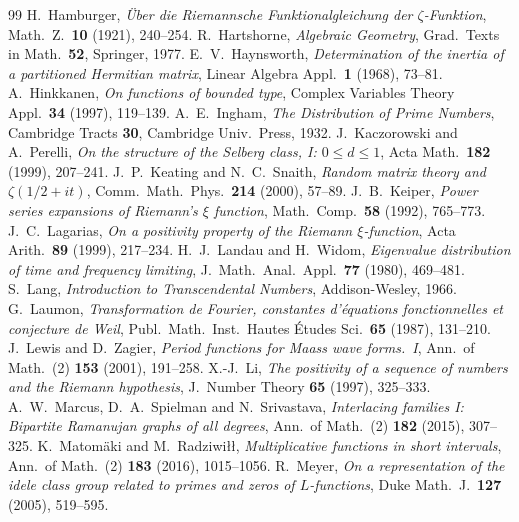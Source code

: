 \documentclass[11pt]{amsart}
\theoremstyle{definition}
\theoremstyle{remark}
\numberwithin{equation}{section}
\begin{document}
\begin{thebibliography}{99}
 H.~Hamburger, \emph{\"Uber die Riemannsche Funktionalgleichung der $\zeta$-Funktion}, Math.\ Z.\ \textbf{10} (1921), 240--254.
 R.~Hartshorne, \emph{Algebraic Geometry}, Grad.\ Texts in Math.\ \textbf{52}, Springer, 1977.
 E.~V.~Haynsworth, \emph{Determination of the inertia of a partitioned Hermitian matrix}, Linear Algebra Appl.\ \textbf{1} (1968), 73--81.
 A.~Hinkkanen, \emph{On functions of bounded type}, Complex Variables Theory Appl.\ \textbf{34} (1997), 119--139.
 A.~E.~Ingham, \emph{The Distribution of Prime Numbers}, Cambridge Tracts \textbf{30}, Cambridge Univ.\ Press, 1932.
 J.~Kaczorowski and A.~Perelli, \emph{On the structure of the Selberg class, I: $0\le d\le1$}, Acta Math.\ \textbf{182} (1999), 207--241.
 J.~P.~Keating and N.~C.~Snaith, \emph{Random matrix theory and $\zeta(1/2+it)$}, Comm.\ Math.\ Phys.\ \textbf{214} (2000), 57--89.
 J.~B.~Keiper, \emph{Power series expansions of Riemann's $\xi$ function}, Math.\ Comp.\ \textbf{58} (1992), 765--773.
 J.~C.~Lagarias, \emph{On a positivity property of the Riemann $\xi$-function}, Acta Arith.\ \textbf{89} (1999), 217--234.
 H.~J.~Landau and H.~Widom, \emph{Eigenvalue distribution of time and frequency limiting}, J.\ Math.\ Anal.\ Appl.\ \textbf{77} (1980), 469--481.
 S.~Lang, \emph{Introduction to Transcendental Numbers}, Addison-Wesley, 1966.
 G.~Laumon, \emph{Transformation de Fourier, constantes d'\'equations fonctionnelles et conjecture de Weil}, Publ.\ Math.\ Inst.\ Hautes \'Etudes Sci.\ \textbf{65} (1987), 131--210.
 J.~Lewis and D.~Zagier, \emph{Period functions for Maass wave forms.\ I}, Ann.\ of Math.\ (2) \textbf{153} (2001), 191--258.
 X.-J.~Li, \emph{The positivity of a sequence of numbers and the Riemann hypothesis}, J.\ Number Theory \textbf{65} (1997), 325--333.
 A.~W.~Marcus, D.~A.~Spielman and N.~Srivastava, \emph{Interlacing families I: Bipartite Ramanujan graphs of all degrees}, Ann.\ of Math.\ (2) \textbf{182} (2015), 307--325.
 K.~Matom\"aki and M.~Radziwi\l\l, \emph{Multiplicative functions in short intervals}, Ann.\ of Math.\ (2) \textbf{183} (2016), 1015--1056.
 R.~Meyer, \emph{On a representation of the idele class group related to primes and zeros of $L$-functions}, Duke Math.\ J.\ \textbf{127} (2005), 519--595.

\end{thebibliography}
\end{document}
